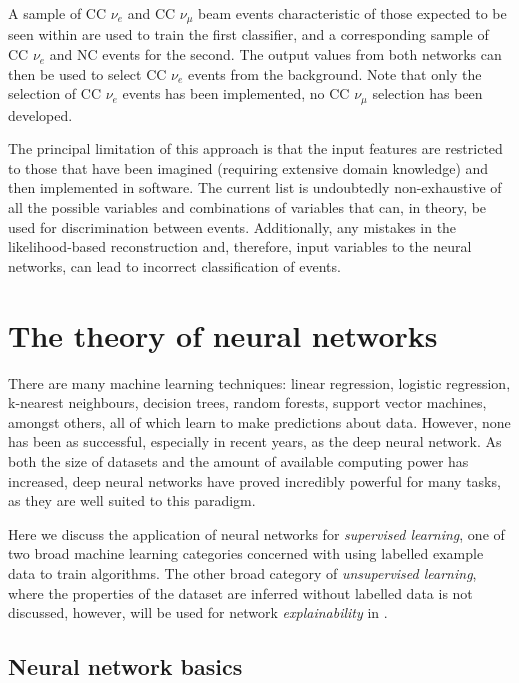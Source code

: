 A sample of CC $\nu_{e}$ and CC $\nu_{\mu}$ beam events characteristic of those expected to be
seen within \chipsfive are used to train the first classifier, and a corresponding sample of CC
$\nu_{e}$ and NC events for the second. The output values from both networks can then be used to
select CC $\nu_{e}$ events from the background. Note that only the selection of CC $\nu_{e}$
events has been implemented, no CC $\nu_{\mu}$ selection has been developed.

The principal limitation of this approach is that the input features are restricted to those that
have been imagined (requiring extensive domain knowledge) and then implemented in software. The
current list is undoubtedly non-exhaustive of all the possible variables and combinations of
variables that can, in theory, be used for discrimination between events. Additionally, any
mistakes in the likelihood-based reconstruction and, therefore, input variables to the neural
networks, can lead to incorrect classification of events.

\section{The theory of neural networks} %
\label{sec:cnn_theory} %

There are many machine learning techniques: linear regression, logistic regression, k-nearest
neighbours, decision trees, random forests, support vector machines, amongst others, all of which
learn to make predictions about data. However, none has been as successful, especially in recent
years, as the deep neural network. As both the size of datasets and the amount of available
computing power has increased, deep neural networks have proved incredibly powerful for many
tasks, as they are well suited to this paradigm.

Here we discuss the application of neural networks for \emph{supervised learning}, one of two
broad machine learning categories concerned with using labelled example data to train algorithms.
The other broad category of \emph{unsupervised learning}, where the properties of the dataset are
inferred without labelled data is not discussed, however, will be used for network
\emph{explainability} in .

\subsection{Neural network basics} %
\label{sec:cnn_theory_basics} %

